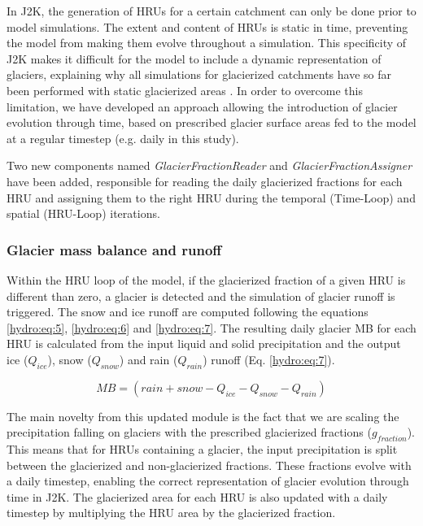 In J2K, the generation of HRUs for a certain catchment can only be done prior to model simulations. The extent and content of HRUs is static in time, preventing the model from making them evolve throughout a simulation. This specificity of J2K makes it difficult for the model to include a dynamic representation of glaciers, explaining why all simulations for glacierized catchments have so far been performed with static glacierized areas \citep{gao_test_2012, nepal_understanding_2014}. In order to overcome this limitation, we have developed an approach allowing the introduction of glacier evolution through time, based on prescribed glacier surface areas fed to the model at a regular timestep (e.g. daily in this study). 

Two new components named \textit{GlacierFractionReader} and \textit{GlacierFractionAssigner} have been added, responsible for reading the daily glacierized fractions for each HRU and assigning them to the right HRU during the temporal (Time-Loop) and spatial (HRU-Loop) iterations. 

\subsubsection{Glacier mass balance and runoff}

Within the HRU loop of the model, if the glacierized fraction of a given HRU is different than zero, a glacier is detected and the simulation of glacier runoff is triggered. The snow and ice runoff are computed following the equations \ref{hydro:eq:5}, \ref{hydro:eq:6} and \ref{hydro:eq:7}. The resulting daily glacier MB for each HRU is calculated from the input liquid and solid precipitation and the output ice ($Q_{ice}$), snow ($Q_{snow}$) and rain ($Q_{rain}$) runoff (Eq. \ref{hydro:eq:7}).

\begin{equation} \label{hydro:eq:7}
MB = (rain + snow - Q_{ice} - Q_{snow} - Q_{rain}) 
\end{equation} 

The main novelty from this updated module is the fact that we are scaling the precipitation falling on glaciers with the prescribed glacierized fractions ($g_{fraction}$). This means that for HRUs containing a glacier, the input precipitation is split between the glacierized and non-glacierized fractions. These fractions evolve with a daily timestep, enabling the correct representation of glacier evolution through time in J2K. The glacierized area for each HRU is also updated with a daily timestep by multiplying the HRU area by the glacierized fraction.

